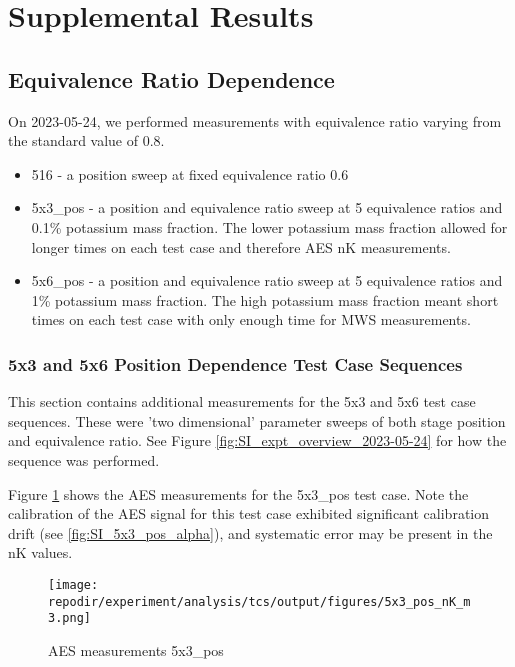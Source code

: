 \section{Supplemental Results}


\clearpage

\subsection{Equivalence Ratio Dependence}

On 2023-05-24, we performed measurements with equivalence ratio varying from the standard value of 0.8. 

\begin{itemize}
    \item 516 - a position sweep at fixed equivalence ratio 0.6
    \item 5x3\_pos - a position and equivalence ratio sweep at 5 equivalence ratios and 0.1\% potassium mass fraction. The lower potassium mass fraction allowed for longer times on each test case and therefore AES nK measurements. 
    \item 5x6\_pos - a position and equivalence ratio sweep at 5 equivalence ratios and 1\% potassium mass fraction. The high potassium mass fraction meant short times on each test case with only enough time for MWS measurements. 
\end{itemize}
 
\subsubsection{5x3 and 5x6 Position Dependence Test Case Sequences}

This section contains additional measurements for the 5x3 and 5x6 test case sequences. These were 'two dimensional' parameter sweeps of both stage position and equivalence ratio. See Figure \ref{fig:SI_expt_overview_2023-05-24} for how the sequence was performed. 

Figure \ref{fig:SI_5x3_pos_nK_m3} shows the AES measurements for the 5x3\_pos test case. Note the calibration of the AES signal for this test case exhibited significant calibration drift (see \ref{fig:SI_5x3_pos_alpha}), and systematic error may be present in the nK values. 

\begin{figure}[]
\centering
\texttt{[image: \\repodir/experiment/analysis/tcs/output/figures/5x3\_pos\_nK\_m3.png]}
\caption{AES measurements 5x3\_pos}
\label{fig:SI_5x3_pos_nK_m3}
\end{figure}

